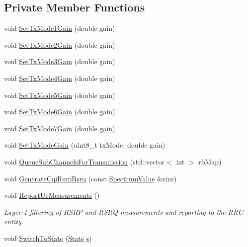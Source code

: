 \subsection*{Private Member Functions}
\begin{DoxyCompactItemize}
\item 
void \hyperlink{classns3_1_1LteUePhy_a0106f6900d62a557cbb005880dcf3eab}{Set\+Tx\+Mode1\+Gain} (double gain)
\item 
void \hyperlink{classns3_1_1LteUePhy_a5f1e724e835f1f2649f1c6dbc605cdff}{Set\+Tx\+Mode2\+Gain} (double gain)
\item 
void \hyperlink{classns3_1_1LteUePhy_a184e30e9ca3fa4d1869482e0d621a131}{Set\+Tx\+Mode3\+Gain} (double gain)
\item 
void \hyperlink{classns3_1_1LteUePhy_ae9c8640332f41ea9560ef0f8b2b9fcac}{Set\+Tx\+Mode4\+Gain} (double gain)
\item 
void \hyperlink{classns3_1_1LteUePhy_a8c7bce2e0d342ff18303a54124c38497}{Set\+Tx\+Mode5\+Gain} (double gain)
\item 
void \hyperlink{classns3_1_1LteUePhy_a58386441bb347f679dc42f00e1d7a14b}{Set\+Tx\+Mode6\+Gain} (double gain)
\item 
void \hyperlink{classns3_1_1LteUePhy_ad190d27a1c71a5c25548d05b2aa6302e}{Set\+Tx\+Mode7\+Gain} (double gain)
\item 
void \hyperlink{classns3_1_1LteUePhy_afedd45e85f16ae96c5cf9b3d63571663}{Set\+Tx\+Mode\+Gain} (uint8\+\_\+t tx\+Mode, double gain)
\item 
void \hyperlink{classns3_1_1LteUePhy_a228ae97dfcf1f7eacf67817581be786b}{Queue\+Sub\+Channels\+For\+Transmission} (std\+::vector$<$ int $>$ rb\+Map)
\item 
void \hyperlink{classns3_1_1LteUePhy_a925f046fc4e8f4727b308f6e0d3ec3b4}{Generate\+Cqi\+Rsrp\+Rsrq} (const \hyperlink{classns3_1_1SpectrumValue}{Spectrum\+Value} \&sinr)
\item 
void \hyperlink{classns3_1_1LteUePhy_af133622a176fd2d2fbd0dc5d1d7e04e8}{Report\+Ue\+Measurements} ()
\begin{DoxyCompactList}\small\item\em Layer-\/1 filtering of R\+S\+RP and R\+S\+RQ measurements and reporting to the R\+RC entity. \end{DoxyCompactList}\item 
void \hyperlink{classns3_1_1LteUePhy_abdac5294f95f613edf1e12fabea44cb4}{Switch\+To\+State} (\hyperlink{classns3_1_1LteUePhy_ae5118801f100c494663f0ca1e942aa31}{State} \hyperlink{generate__test__data__lte__sinr_8m_ad83eeb3a142285d1243a08c6b7026df8}{s})

\end{DoxyCompactItemize}
